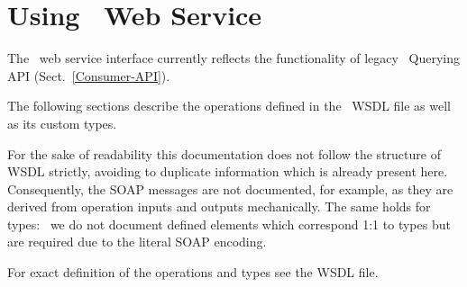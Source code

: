 
\section{Using \LB\ Web Service}



The \LB\ web service interface currently reflects the functionality of legacy
\LB\ Querying API (Sect.~\ref{Consumer-API}).

The following sections describe the operations defined in the \LB\ WSDL
file as well as its custom types.

For the sake of readability this documentation does not follow the structure
of WSDL strictly, avoiding to duplicate information which is already present
here. Consequently, the SOAP messages are not documented, for example, as they
are derived from operation inputs and outputs mechanically.
The same holds for types: \eg\ we do not document defined elements
which correspond 1:1 to types but are required due to the literal SOAP
encoding.

For exact definition of the operations and types see the WSDL file.

